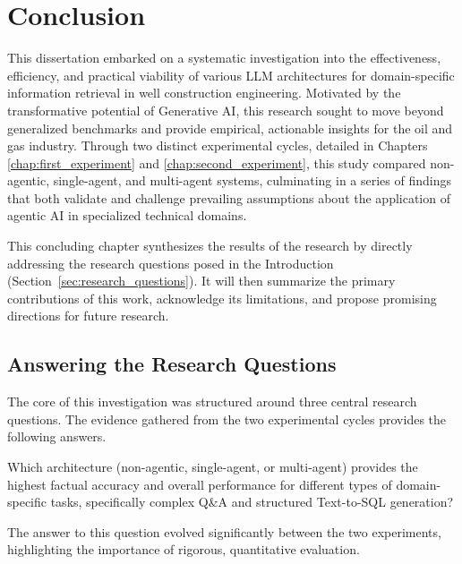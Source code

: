 \chapter{Conclusion}
\label{chap:conclusion}

This dissertation embarked on a systematic investigation into the effectiveness, efficiency, and practical viability of various LLM architectures for domain-specific information retrieval in well construction engineering. Motivated by the transformative potential of Generative AI, this research sought to move beyond generalized benchmarks and provide empirical, actionable insights for the oil and gas industry. Through two distinct experimental cycles, detailed in Chapters \ref{chap:first_experiment} and \ref{chap:second_experiment}, this study compared non-agentic, single-agent, and multi-agent systems, culminating in a series of findings that both validate and challenge prevailing assumptions about the application of agentic AI in specialized technical domains.

This concluding chapter synthesizes the results of the research by directly addressing the research questions posed in the Introduction (Section~\ref{sec:research_questions}). It will then summarize the primary contributions of this work, acknowledge its limitations, and propose promising directions for future research.

\section{Answering the Research Questions}
\label{sec:conclusion_rq}

    The core of this investigation was structured around three central research questions. The evidence gathered from the two experimental cycles provides the following answers.

    \vspace{\baselineskip}
    \begin{tcolorbox}[colback=gray!10, colframe=gray!40, title=\textbf{RQ1: Performance and Task-Dependency}]
    Which architecture (non-agentic, single-agent, or multi-agent) provides the highest factual accuracy and overall performance for different types of domain-specific tasks, specifically complex Q\&A and structured Text-to-SQL generation?
    \end{tcolorbox}
    \vspace{\baselineskip}

    The answer to this question evolved significantly between the two experiments, highlighting the importance of rigorous, quantitative evaluation.


